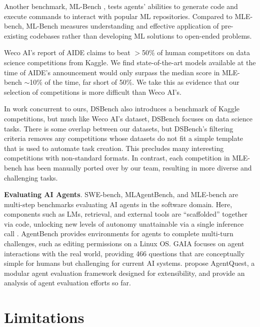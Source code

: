 \documentclass{article} %
\begin{document}
Another benchmark, ML-Bench \citep{tang_ml-bench_2024}, tests agents' abilities to generate code and execute commands to interact with popular ML repositories. Compared to MLE-bench, ML-Bench measures understanding and effective application of pre-existing codebases rather than developing ML solutions to open-ended problems.

Weco AI's report of AIDE \citep{wecoai_wecoaiaideml_2024} claims to beat $>$50\% of human competitors on data science competitions from Kaggle. We find state-of-the-art models available at the time of AIDE's announcement would only surpass the median score in MLE-bench $\sim$10\% of the time, far short of 50\%. We take this as evidence that our selection of competitions is more difficult than Weco AI's.

In work concurrent to ours, DSBench \citep{jing_dsbench_2024} also introduces a benchmark of Kaggle competitions, but much like Weco AI's dataset, DSBench focuses on data science tasks. There is some overlap between our datasets, but DSBench's filtering criteria removes any competitions whose datasets do not fit a simple template that is used to automate task creation. This precludes many interesting competitions with non-standard formats. In contrast, each competition in MLE-bench has been manually ported over by our team, resulting in more diverse and challenging tasks.

\textbf{Evaluating AI Agents}. SWE-bench, MLAgentBench, and MLE-bench are multi-step benchmarks evaluating AI agents in the software domain. Here, components such as LMs, retrieval, and external tools are ``scaffolded'' together via code, unlocking new levels of autonomy unattainable via a single inference call \citep{zaharia_shift_2024}. AgentBench \citep{liu_agentbench_2023} provides environments for agents to complete multi-turn challenges, such as editing permissions on a Linux OS. GAIA \citep{mialon_gaia_2023} focuses on agent interactions with the real world, providing 466 questions that are conceptually simple for humans but challenging for current AI systems. \citet{gioacchini_agentquest_2024} propose AgentQuest, a modular agent evaluation framework designed for extensibility, and \citet{kapoor_ai_2024} provide an analysis of agent evaluation efforts so far.

\section{Limitations}
\label{sec:limitations}
\end{document}
